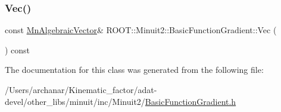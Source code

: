 \mbox{\label{classROOT_1_1Minuit2_1_1BasicFunctionGradient_a4c0d60175db412ac03313f824a055886}} 
\subsubsection{\texorpdfstring{Vec()}{Vec()}\hspace{0.1cm}{\footnotesize\ttfamily [3/3]}}
{\footnotesize\ttfamily const \mbox{\hyperlink{namespaceROOT_1_1Minuit2_a62ed97730a1ca8d3fbaec64a19aa11c9}{Mn\+Algebraic\+Vector}}\& R\+O\+O\+T\+::\+Minuit2\+::\+Basic\+Function\+Gradient\+::\+Vec (\begin{DoxyParamCaption}{ }\end{DoxyParamCaption}) const\hspace{0.3cm}{\ttfamily [inline]}}



The documentation for this class was generated from the following file\+:\begin{DoxyCompactItemize}
\item 
/\+Users/archanar/\+Kinematic\+\_\+factor/adat-\/devel/other\+\_\+libs/minuit/inc/\+Minuit2/\mbox{\hyperlink{adat-devel_2other__libs_2minuit_2inc_2Minuit2_2BasicFunctionGradient_8h}{Basic\+Function\+Gradient.\+h}}\end{DoxyCompactItemize}

